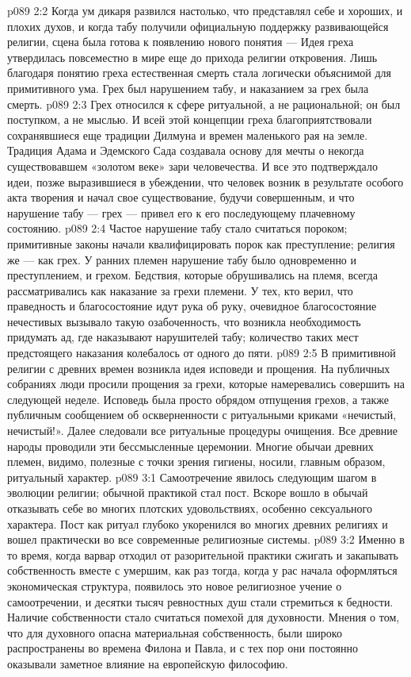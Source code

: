 \vs p089 2:2 Когда ум дикаря развился настолько, что представлял себе и хороших, и плохих духов, и когда табу получили официальную поддержку развивающейся религии, сцена была готова к появлению нового понятия ---  Идея греха утвердилась повсеместно в мире еще до прихода религии откровения. Лишь благодаря понятию греха естественная смерть стала логически объяснимой для примитивного ума. Грех был нарушением табу, и наказанием за грех была смерть.
\vs p089 2:3 Грех относился к сфере ритуальной, а не рациональной; он был поступком, а не мыслью. И всей этой концепции греха благоприятствовали сохранявшиеся еще традиции Дилмуна и времен маленького рая на земле. Традиция Адама и Эдемского Сада создавала основу для мечты о некогда существовавшем «золотом веке» зари человечества. И все это подтверждало идеи, позже выразившиеся в убеждении, что человек возник в результате особого акта творения и начал свое существование, будучи совершенным, и что нарушение табу --- грех --- привел его к его последующему плачевному состоянию.
\vs p089 2:4 Частое нарушение табу стало считаться пороком; примитивные законы начали квалифицировать порок как преступление; религия же --- как грех. У ранних племен нарушение табу было одновременно и преступлением, и грехом. Бедствия, которые обрушивались на племя, всегда рассматривались как наказание за грехи племени. У тех, кто верил, что праведность и благосостояние идут рука об руку, очевидное благосостояние нечестивых вызывало такую озабоченность, что возникла необходимость придумать ад, где наказывают нарушителей табу; количество таких мест предстоящего наказания колебалось от одного до пяти.
\vs p089 2:5 В примитивной религии с древних времен возникла идея исповеди и прощения. На публичных собраниях люди просили прощения за грехи, которые намеревались совершить на следующей неделе. Исповедь была просто обрядом отпущения грехов, а также публичным сообщением об оскверненности с ритуальными криками «нечистый, нечистый!». Далее следовали все ритуальные процедуры очищения. Все древние народы проводили эти бессмысленные церемонии. Многие обычаи древних племен, видимо, полезные с точки зрения гигиены, носили, главным образом, ритуальный характер.
\vs p089 3:1 Самоотречение явилось следующим шагом в эволюции религии; обычной практикой стал пост. Вскоре вошло в обычай отказывать себе во многих плотских удовольствиях, особенно сексуального характера. Пост как ритуал глубоко укоренился во многих древних религиях и вошел практически во все современные религиозные системы.
\vs p089 3:2 Именно в то время, когда варвар отходил от разорительной практики сжигать и закапывать собственность вместе с умершим, как раз тогда, когда у рас начала оформляться экономическая структура, появилось это новое религиозное учение о самоотречении, и десятки тысяч ревностных душ стали стремиться к бедности. Наличие собственности стало считаться помехой для духовности. Мнения о том, что для духовного опасна материальная собственность, были широко распространены во времена Филона и Павла, и с тех пор они постоянно оказывали заметное влияние на европейскую философию.
